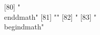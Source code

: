  [80] "\\end{dmath}"                                                                                                                                                                                                                                                                                                                                                                                                                                                                                                                                                                                                                                 
 [81] ""                                                                                                                                                                                                                                                                                                                                                                                                                                                                                                                                                                                                                                             
 [82] "%
 [83] "\\begin{dmath}"                                                                                                                                                                                                                                                                                                                                                                                                                                                                                                                                                                                                                               
